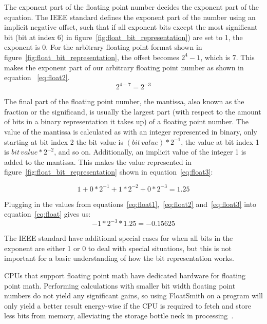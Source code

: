The exponent part of the floating point number decides the exponent part of the equation. The IEEE standard defines the exponent part of the number using an implicit negative offset, such that if all exponent bits except the most significant bit (bit at index 6) in figure~\ref{fig:float_bit_representation}) are set to 1, the exponent is 0. For the arbitrary floating point format shown in figure~\ref{fig:float_bit_representation}, the offset becomes $2^4 - 1$, which is 7. This makes the exponent part of our arbitrary floating point number as shown in equation ~\ref{eq:float2}.
\begin{equation} \label{eq:float2}
    2^{4-7} = 2^{-3}
\end{equation}

The final part of the floating point number, the mantissa, also known as the fraction or the significand, is usually the largest part (with respect to the amount of bits in a binary representation it takes up) of a floating point number.
The value of the mantissa is calculated as with an integer represented in binary, only starting at bit index 2 the bit value is $(bit\,value)*2^{-1}$, the value at bit index 1 is $bit\,value*2^{-2}$, and so on. Additionally, an implicit value of the integer 1 is added to the mantissa. This makes the value represented in figure~\ref{fig:float_bit_representation} shown in equation~\ref{eq:float3}:

\begin{equation}\label{eq:float3}
   1 + 0*2^{-1} + 1*2^{-2} + 0*2^{-3} = 1.25
\end{equation}

Plugging in the values from equations~\ref{eq:float1},~\ref{eq:float2} and~\ref{eq:float3} into equation~\ref{eq:float} gives us:
\begin{equation}\label{eq:float4}
-1 * 2^{-3} * 1.25 = -0.15625
\end{equation}

The IEEE standard have additional special cases for when all bits in the exponent are either 1 or 0 to deal with special situations, but this is not important for a basic understanding of how the bit representation works.


CPUs that support floating point math have dedicated hardware for floating point math. Performing calculations with smaller bit width floating point numbers do not yield any significant gains, so using FloatSmith on a program will only yield a better result energy-wise if the CPU is required to fetch and store less bits from memory, alleviating the storage bottle neck in processing~\citep{floatsmith_paper}. 

